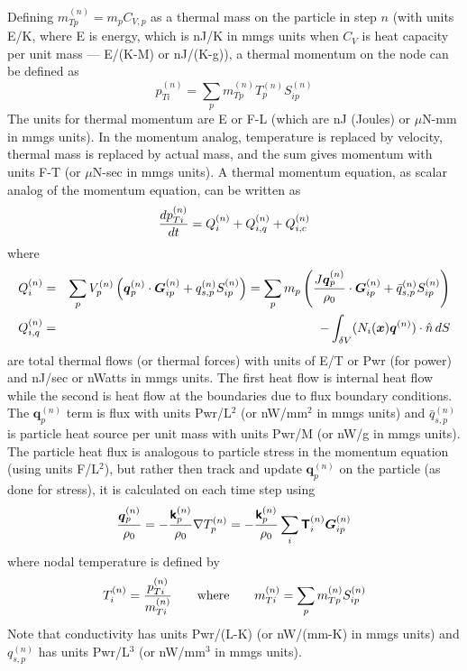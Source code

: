 \documentclass[11pt]{article}
\renewcommand{\vec}[1]{\boldsymbol{#1}}
\newcommand{\tens}[1]{\boldsymbol{\mathsf{#1}}}
\begin{document}
Defining $m_{Tp}^{(n)} = m_p C_{V,p}$ as a thermal mass on the particle in step $n$ (with units E/K, where E is energy, which is nJ/K in mmgs units when $C_{V}$ is heat capacity per unit mass --- E/(K-M) or nJ/(K-g)), a thermal momentum on the node can be defined as
\begin{equation}
      p_{Ti}^{(n)} = \sum_p  m_{Tp}^{(n)} T_p^{(n)} S^{(n)}_{ip}  
\end{equation}
The units for thermal momentum are E or F-L (which are nJ (Joules) or $\mu$N-mm in mmgs units). In the momentum analog, temperature is replaced by velocity, thermal mass is replaced by actual mass, and the sum gives momentum with units F-T (or $\mu$N-sec in mmgs units). A thermal momentum equation, as scalar analog of the momentum equation, can be written as
\begin{equation}
     {d p_{Ti}^{(n)}\over dt} = Q_{i}^{(n)} + Q_{i,q}^{(n)} + Q_{i,c}^{(n)}
\end{equation}
where
\begin{eqnarray}
      Q_{i}^{(n)} & = & \sum_p V_p^{(n)}  \left(\vec q_p^{(n)}\cdot \vec G^{(n)}_{ip}  + q_{s,p}^{(n)} S^{(n)}_{ip} \right) 
      =  \sum_p m_p\left( { J \vec q_p^{(n)}\over \rho_0}\cdot \vec G^{(n)}_{ip}  + \bar q_{s,p}^{(n)} S^{(n)}_{ip}\right) \\
      Q_{i,q}^{(n)} & = & -  \int_{\delta V} (N_i(\vec x)\vec q^{(n)})\cdot \hat n \thinspace dS 
\end{eqnarray}
are total thermal flows (or thermal forces) with units of E/T or Pwr (for power) and nJ/sec or nWatts in mmgs units. The first heat flow is internal heat flow while the second is heat flow at the boundaries due to flux boundary conditions. The $\vec q_p^{(n)}$ term is flux with units Pwr/L$^2$ (or nW/mm$^2$ in mmgs units) and $\bar q_{s,p}^{(n)}$ is particle heat source per unit mass with units Pwr/M (or nW/g in mmgs units). The particle heat flux is analogous to particle stress in the momentum equation (using units F/L$^2$), but rather then track and update $\vec q_p^{(n)}$ on the particle (as done for stress), it is calculated on each time step using
\begin{equation}
    {\vec q_p^{(n)}\over \rho_0} = -{\tens k_p^{(n)}\over \rho_0}\nabla T_p^{(n)} 
                                 = - {\tens k_p^{(n)}\over \rho_0}\sum_i \tens  T_i^{(n)} \vec G^{(n)}_{ip}
\end{equation}
where nodal temperature is defined by
\begin{equation}
       T_i^{(n)} = {p_{Ti}^{(n)} \over m_{Ti}^{(n)}} \qquad {\rm where } \qquad m_{Ti}^{(n)} = \sum_p  m_{Tp}^{(n)} S^{(n)}_{ip}  
\end{equation}
Note that conductivity has units Pwr/(L-K) (or nW/(mm-K) in mmgs units) and $q_{s,p}^{(n)}$ has units Pwr/L$^3$ (or nW/mm$^3$ in mmgs units).
\end{document}
